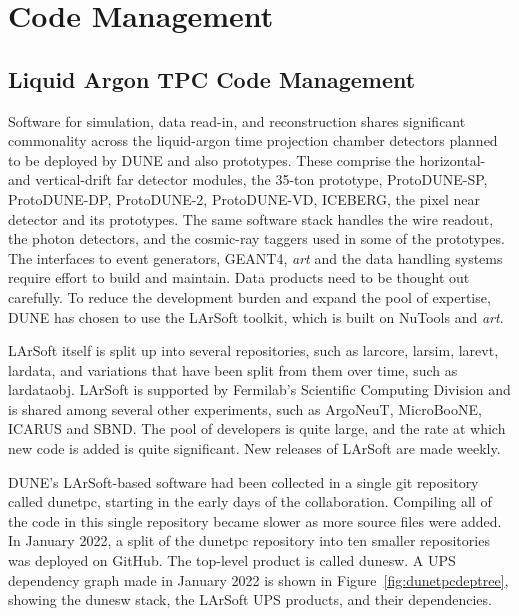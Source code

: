 \documentclass[../main-v1.tex]{subfiles}
\begin{document}
\chapter{Code Management }
\label{ch:codemgmt}


\section{Liquid Argon TPC Code Management }
\label{sec:codemgmt:dunetpc}  %

Software for simulation, data read-in, and reconstruction shares significant commonality across the liquid-argon time projection chamber detectors planned to be deployed by DUNE and also prototypes.  These comprise the horizontal- and vertical-drift far detector modules, the 35-ton prototype, ProtoDUNE-SP, ProtoDUNE-DP, ProtoDUNE-2, ProtoDUNE-VD, ICEBERG, the pixel near detector and its prototypes.  The same software stack handles the wire readout, the photon detectors, and the cosmic-ray taggers used in some of the prototypes.  The interfaces to event generators, GEANT4, {\it art} and the data handling systems require effort to build and maintain.  Data products need to be thought out carefully.  To reduce the development burden and expand the pool of expertise, DUNE has chosen to use the LArSoft toolkit, which is built on NuTools and {\it art}.  

LArSoft itself is split up into several repositories, such as larcore, larsim, larevt, lardata, and variations that have been split from them over time, such as lardataobj.  LArSoft is supported by Fermilab's Scientific Computing Division and is shared among several other experiments, such as ArgoNeuT, MicroBooNE, ICARUS and SBND.  The pool of developers is quite large, and the rate at which new code is added is quite significant.  New releases of LArSoft are made weekly.  

DUNE's LArSoft-based software had been collected in a single git repository called dunetpc, starting in the early days of the collaboration.  Compiling all of the code in this single repository became slower as more source files were added.  In January 2022, a split of the dunetpc repository into ten smaller repositories was deployed on GitHub.  The top-level product is called dunesw.  A UPS dependency graph made in January 2022 is shown in Figure~\ref{fig:dunetpcdeptree}, showing the dunesw stack, the LArSoft UPS products, and their dependencies.
\end{document}
